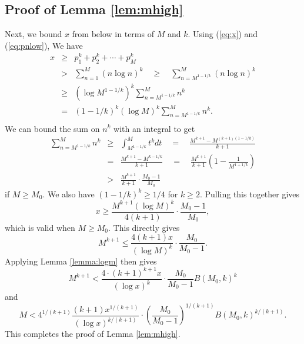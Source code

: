 \documentclass[11pt]{amsart}
\newcommand{\p}[1]{\left(#1\right)}
\numberwithin{equation}{section}
\numberwithin{algorithm}{section}
\begin{document}
\subsection{Proof of Lemma \ref{lem:mhigh}}


Next, we bound $x$ from below in terms of $M$ and $k$.
Using (\ref{eq:x}) and (\ref{eq:pnlow}), We have
\begin{eqnarray*}
x &\ge& p_1^k + p_2^k + \cdots + p_M^k \\
  & > & \sum_{n=1}^{M}(n \log n)^k 
  \quad \ge\quad  \sum_{n=M^{1-1/k}}^{M}(n \log n)^k \\
  & \ge & (\log M^{1-1/k})^k \sum_{n=M^{1-1/k}}^{M}n^k \\
  & = & (1-1/k)^k (\log M)^k \sum_{n=M^{1-1/k}}^{M}n^k. \\
\end{eqnarray*}
We can bound the sum on $n^k$ with an integral to get
\begin{eqnarray*}
\sum_{n=M^{1-1/k}}^{M}n^k
 &\ge& 
  \int_{M^{1-1/k}}^{M} t^k dt \quad = \quad
   \frac{M^{k+1}-{M^{(k+1)(1-1/k)}}}{k+1} \\
  &=& \frac{M^{k+1}-{M^{k-1/k}}}{k+1}
  \quad = \quad
  \frac{M^{k+1}}{k+1} \left(1 -\frac{1}{M^{1+1/k}}\right) \\
  &>& \frac{M^{k+1}}{k+1}\cdot \frac{M_0-1}{M_0}
\end{eqnarray*}
if $M\ge M_0$.
We also have $(1-1/k)^k \ge 1/4$ for $k\ge 2$.
Pulling this together gives
$$
x \ge \frac{M^{k+1} (\log M)^k}{4(k+1)}\cdot \frac{M_0-1}{M_0},
$$
which is valid when $M\ge M_0$.
This directly gives
$$ M^{k+1}\le \frac{4(k+1) x}{(\log M)^k}\cdot \frac{M_0}{M_0-1} .$$
Applying Lemma \ref{lemma:logm} then gives
$$
M^{k+1}< \frac{4\cdot(k+1)^{k+1}  x}{(\log x)^k}
  \cdot \frac{M_0}{M_0-1} B(M_0,k)^k
$$
and
$$
M < 4^{1/(k+1)}\frac{(k+1) x^{1/(k+1)}}{(\log x)^{k/(k+1)}}
\cdot \left(\frac{M_0}{M_0-1}\right)^{1/(k+1)} B(M_0,k)^{k/(k+1)}.
$$
This completes the proof of Lemma \ref{lem:mhigh}.

%
%
\end{document}
